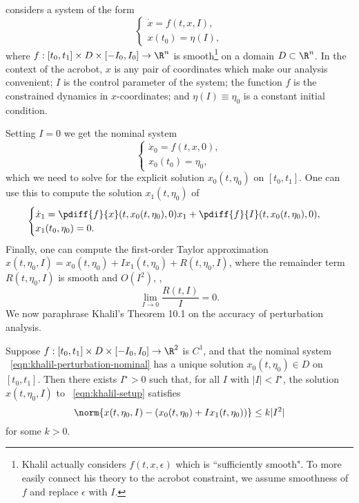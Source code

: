 \citet{khalil_nonlinear} considers a system of the form
\begin{equation}\label{eqn:khalil-setup}
    \begin{cases}
        \dot{x} = f(t,x,I), \\
        x(t_0) = \eta(I),
    \end{cases}
\end{equation}
where 
\(f : [t_0,t_1] \times D \times [-I_0,I_0] \rightarrow \R^n\) is  
smooth\footnote{Khalil actually considers \(f(t,x,\epsilon)\) which is ``sufficiently
    smooth". To more easily connect his theory to the acrobot constraint, we
    assume smoothness of \(f\) and replace \(\epsilon\) with \(I\).}
on a domain \(D \subset \R^n\).
In the context of the acrobot, \(x\) is any pair of coordinates which make
our analysis convenient;
\(I\) is the control parameter of the system;
the function \(f\) is the constrained dynamics in \(x\)-coordinates;
and \(\eta(I) \equiv \eta_0\) is a constant initial condition.

Setting \(I = 0\) we get the nominal system
\begin{equation}\label{eqn:khalil-perturbation-nominal}
    \begin{cases}
        \dot{x}_0 = f(t,x,0) ,\\
        x_0(t_0) = \eta_0 ,
    \end{cases}
\end{equation}
which we need to solve for the explicit solution \(x_0(t,\eta_0)\) on \([t_0,t_1]\).
One can use this to compute the solution \(x_1(t,\eta_0)\) of
\begin{equation}\label{eqn:khalil-perturbation-firstorder}
    \begin{cases}
        \dot{x}_1 = \pdiff{f}{x}(t,x_0(t,\eta_0),0)x_1 + \pdiff{f}{I}(t,x_0(t,\eta_0),0)
        , \\
        x_1(t_0,\eta_0) = 0
        .
    \end{cases}
\end{equation}
Finally, one can compute the first-order Taylor approximation 
\(x(t,\eta_0,I) = x_0(t,\eta_0) + I x_1(t,\eta_0) + R(t,\eta_0,I)\), where the remainder
term \(R(t,\eta_0,I)\) is smooth and \(O(I^2)\), \ie,
\[
    \lim \limits_{I \to 0} \frac{R(t,I)}{I} = 0
    .
\]
We now paraphrase Khalil's Theorem 10.1 \cite{khalil_nonlinear} on the
accuracy of perturbation analysis.
\begin{thm}\label{thm:khalil-perturbation}
    Suppose \(f : [t_0,t_1] \times D \times [-I_0,I_0] \rightarrow \R^2\) is
    \(C^1\), and that the nominal system ~\eqref{eqn:khalil-perturbation-nominal} has a
    unique solution \(x_0(t,\eta_0) \in D\) on \([t_0,t_1]\).
    Then there exists \(I^\star > 0\) such that, for all \(I\) with \(|I| < I^\star\), the
    solution \(x(t,\eta_0,I)\) to ~\eqref{eqn:khalil-setup} satisfies
    \[
        \norm{x(t,\eta_0,I) - \left(x_0(t,\eta_0) + I x_1(t,\eta_0)\right)} \leq k |I^2|
    \]
    for some \(k > 0\).
\end{thm}

